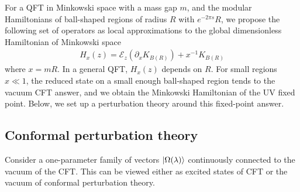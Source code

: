 \documentclass[a4paper,11pt]{article}
\theoremstyle{definition}
\newcommand{\nn}{\nonumber}
\newcommand{\lb}{\left(}
\newcommand{\rb}{\right)}
\newcommand{\p}{\partial}
\begin{document}
For a QFT in Minkowski space with a mass gap $m$, and the modular Hamiltonians of ball-shaped regions of radius $R$ with $e^{-2\pi s}R$, we propose the following set of operators as local approximations to the global dimensionless Hamiltonian of Minkowski space
\begin{eqnarray}
    H_x(z)=\mathcal{E}_z(\p_x K_{B(R)})+ x^{-1} K_{B(R)}
\end{eqnarray}
where $x=m R$. In a general QFT, $H_x(z)$ depends on $R$. For small regions $x\ll 1$, the reduced state on a small enough ball-shaped region tends to the vacuum CFT answer, and we obtain the Minkowski Hamiltonian of the UV fixed point. Below, we set up a perturbation theory around this fixed-point answer.

\subsection*{Conformal perturbation theory}

Consider a one-parameter family of vectors $\ket{\Omega(\lambda)}$ continuously connected to the vacuum of the CFT. This can be viewed either as excited states of CFT or the vacuum of conformal perturbation theory. 
\end{document}
